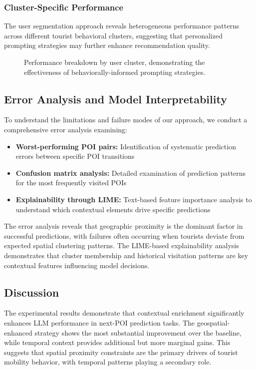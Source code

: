 \documentclass[12pt,a4paper]{article}
\begin{document}
\subsubsection{Cluster-Specific Performance}

The user segmentation approach reveals heterogeneous performance patterns across different tourist behavioral clusters, suggesting that personalized prompting strategies may further enhance recommendation quality.

\begin{figure}[h]
\centering
\caption{Performance breakdown by user cluster, demonstrating the effectiveness of behaviorally-informed prompting strategies.}
\label{fig:cluster_performance}
\end{figure}

\subsection{Error Analysis and Model Interpretability}

To understand the limitations and failure modes of our approach, we conduct a comprehensive error analysis examining:

\begin{itemize}
\item \textbf{Worst-performing POI pairs:} Identification of systematic prediction errors between specific POI transitions
\item \textbf{Confusion matrix analysis:} Detailed examination of prediction patterns for the most frequently visited POIs
\item \textbf{Explainability through LIME:} Text-based feature importance analysis to understand which contextual elements drive specific predictions
\end{itemize}

The error analysis reveals that geographic proximity is the dominant factor in successful predictions, with failures often occurring when tourists deviate from expected spatial clustering patterns. The LIME-based explainability analysis demonstrates that cluster membership and historical visitation patterns are key contextual features influencing model decisions.

\subsection{Discussion}

The experimental results demonstrate that contextual enrichment significantly enhances LLM performance in next-POI prediction tasks. The geospatial-enhanced strategy shows the most substantial improvement over the baseline, while temporal context provides additional but more marginal gains. This suggests that spatial proximity constraints are the primary drivers of tourist mobility behavior, with temporal patterns playing a secondary role.
\end{document}
